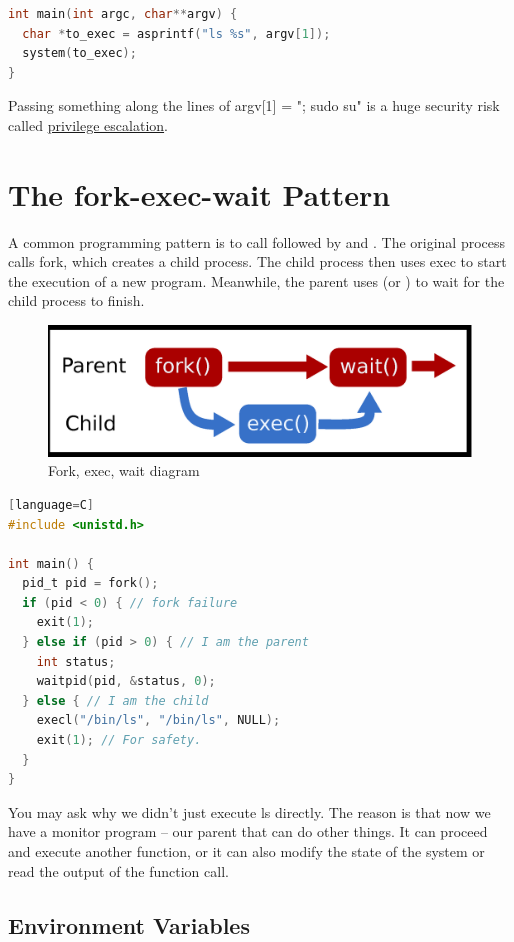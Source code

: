 \begin{lstlisting}[language=C]
int main(int argc, char**argv) {
  char *to_exec = asprintf("ls %s", argv[1]);
  system(to_exec);
}
\end{lstlisting}

Passing something along the lines of argv[1] = "; sudo su" is a huge security risk called \href{https://en.wikipedia.org/wiki/Privilege\_escalation}{privilege escalation}.

\section{The fork-exec-wait Pattern}

A common programming pattern is to call  followed by  and .
The original process calls fork, which creates a child process.
The child process then uses exec to start the execution of a new program.
Meanwhile, the parent uses  (or ) to wait for the child process to finish.

\begin{figure}[H]
\centering
\includegraphics[width=.7\textwidth]{processes/drawings/fork_exec_wait.eps}
\caption{Fork, exec, wait diagram}
\end{figure}

\begin{lstlisting}[language=C][language=C]
#include <unistd.h>

int main() {
  pid_t pid = fork();
  if (pid < 0) { // fork failure
    exit(1);
  } else if (pid > 0) { // I am the parent
    int status;
    waitpid(pid, &status, 0);
  } else { // I am the child
    execl("/bin/ls", "/bin/ls", NULL);
    exit(1); // For safety.
  }
}
\end{lstlisting}

You may ask why we didn't just execute ls directly.
The reason is that now we have a monitor program -- our parent that can do other things.
It can proceed and execute another function, or it can also modify the state of the system or read the output of the function call.

\subsection{Environment Variables}

